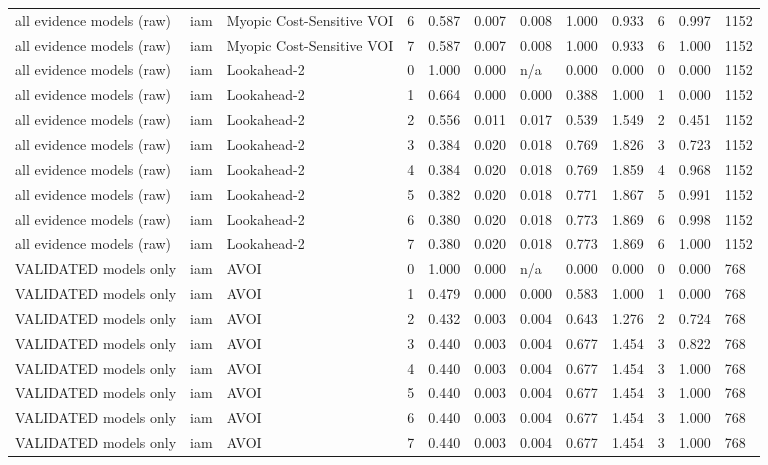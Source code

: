 \begin{table}[!ht]
{\begin{tabular}{llllllllllll}
all evidence models (raw) & iam & Myopic Cost-Sensitive VOI & 6 & 0.587 & 0.007 & 0.008 & 1.000 & 0.933 & 6 & 0.997 & 1152 \\
all evidence models (raw) & iam & Myopic Cost-Sensitive VOI & 7 & 0.587 & 0.007 & 0.008 & 1.000 & 0.933 & 6 & 1.000 & 1152 \\
all evidence models (raw) & iam & Lookahead-2 & 0 & 1.000 & 0.000 & n/a & 0.000 & 0.000 & 0 & 0.000 & 1152 \\
all evidence models (raw) & iam & Lookahead-2 & 1 & 0.664 & 0.000 & 0.000 & 0.388 & 1.000 & 1 & 0.000 & 1152 \\
all evidence models (raw) & iam & Lookahead-2 & 2 & 0.556 & 0.011 & 0.017 & 0.539 & 1.549 & 2 & 0.451 & 1152 \\
all evidence models (raw) & iam & Lookahead-2 & 3 & 0.384 & 0.020 & 0.018 & 0.769 & 1.826 & 3 & 0.723 & 1152 \\
all evidence models (raw) & iam & Lookahead-2 & 4 & 0.384 & 0.020 & 0.018 & 0.769 & 1.859 & 4 & 0.968 & 1152 \\
all evidence models (raw) & iam & Lookahead-2 & 5 & 0.382 & 0.020 & 0.018 & 0.771 & 1.867 & 5 & 0.991 & 1152 \\
all evidence models (raw) & iam & Lookahead-2 & 6 & 0.380 & 0.020 & 0.018 & 0.773 & 1.869 & 6 & 0.998 & 1152 \\
all evidence models (raw) & iam & Lookahead-2 & 7 & 0.380 & 0.020 & 0.018 & 0.773 & 1.869 & 6 & 1.000 & 1152 \\
VALIDATED models only & iam & AVOI & 0 & 1.000 & 0.000 & n/a & 0.000 & 0.000 & 0 & 0.000 & 768 \\
VALIDATED models only & iam & AVOI & 1 & 0.479 & 0.000 & 0.000 & 0.583 & 1.000 & 1 & 0.000 & 768 \\
VALIDATED models only & iam & AVOI & 2 & 0.432 & 0.003 & 0.004 & 0.643 & 1.276 & 2 & 0.724 & 768 \\
VALIDATED models only & iam & AVOI & 3 & 0.440 & 0.003 & 0.004 & 0.677 & 1.454 & 3 & 0.822 & 768 \\
VALIDATED models only & iam & AVOI & 4 & 0.440 & 0.003 & 0.004 & 0.677 & 1.454 & 3 & 1.000 & 768 \\
VALIDATED models only & iam & AVOI & 5 & 0.440 & 0.003 & 0.004 & 0.677 & 1.454 & 3 & 1.000 & 768 \\
VALIDATED models only & iam & AVOI & 6 & 0.440 & 0.003 & 0.004 & 0.677 & 1.454 & 3 & 1.000 & 768 \\
VALIDATED models only & iam & AVOI & 7 & 0.440 & 0.003 & 0.004 & 0.677 & 1.454 & 3 & 1.000 & 768 \\

\end{tabular}}
\end{table}
